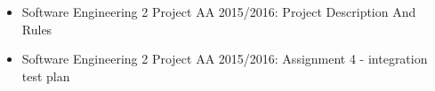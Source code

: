 \begin{itemize}
	\item Software Engineering 2 Project AA 2015/2016: Project Description And Rules
	\item Software Engineering 2 Project AA 2015/2016: Assignment 4 - integration test plan
\end{itemize}